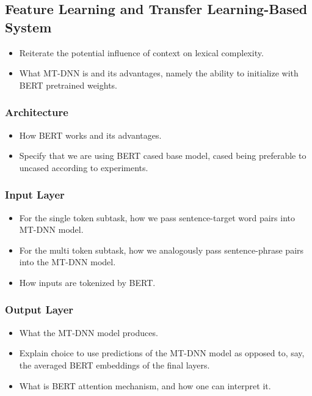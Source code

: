 \documentclass[11pt,a4paper]{article}
\begin{document}
\subsection{Feature Learning and Transfer Learning-Based System}
\begin{itemize}
  \item Reiterate the potential influence of context on lexical complexity.
  \item What MT-DNN is and its advantages, namely the ability to initialize with BERT pretrained weights.
\end{itemize}

\subsubsection{Architecture}
\begin{itemize}
  \item How BERT works and its advantages.
  \item Specify that we are using BERT cased base model, cased being preferable to uncased according to experiments.
\end{itemize}

\subsubsection{Input Layer}
\begin{itemize}
  \item For the single token subtask, how we pass sentence-target word pairs into MT-DNN model.
  \item For the multi token subtask, how we analogously pass sentence-phrase pairs into the MT-DNN model.
  \item How inputs are tokenized by BERT.
\end{itemize}

\subsubsection{Output Layer}
\begin{itemize}
  \item What the MT-DNN model produces.
  \item Explain choice to use predictions of the MT-DNN model as opposed to, say, the averaged BERT embeddings of the final layers.
  \item What is BERT attention mechanism, and how one can interpret it.
\end{itemize}
\end{document}
